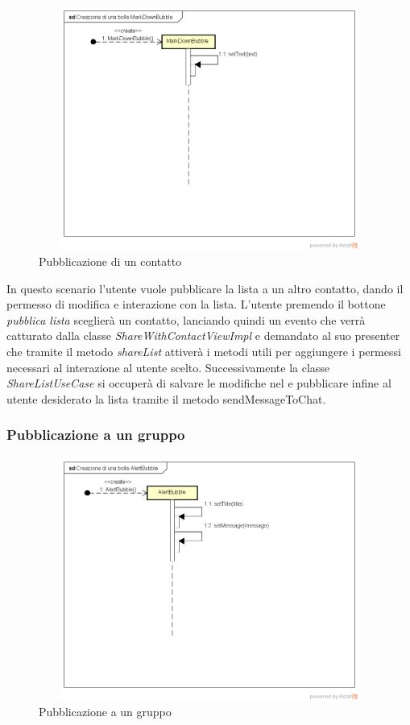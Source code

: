 \label{Pubblicazione di un contatto}
\begin{figure}[H]
	\centering
	\includegraphics[width=12cm, height=8cm]{Sezioni/Diagrammi/img/Creazione di una bolla MarkDownBubble.png}
	\caption{Pubblicazione di un contatto}
	
\end{figure}
In questo scenario l'utente vuole pubblicare la lista a un altro contatto, dando il permesso di modifica e interazione con la lista. L'utente premendo il bottone \textit{pubblica lista} sceglierà un contatto, lanciando quindi un evento che verrà catturato dalla classe \textit{ShareWithContactViewImpl} e demandato al suo presenter che tramite il metodo \textit{shareList} attiverà i metodi utili per aggiungere i permessi necessari al interazione al utente scelto. Successivamente la classe \textit{ShareListUseCase} si occuperà di salvare le modifiche nel  e pubblicare infine al utente desiderato la lista tramite il metodo {sendMessageToChat}.


\subsubsection{Pubblicazione a un gruppo}

\label{Pubblicazione a un gruppo}
\begin{figure}[H]
	\centering
	\includegraphics[width=12cm, height=8cm]{Sezioni/Diagrammi/img/Creazione di una bolla AlertBubble.png}
	\caption{Pubblicazione a un gruppo}
	
\end{figure}

